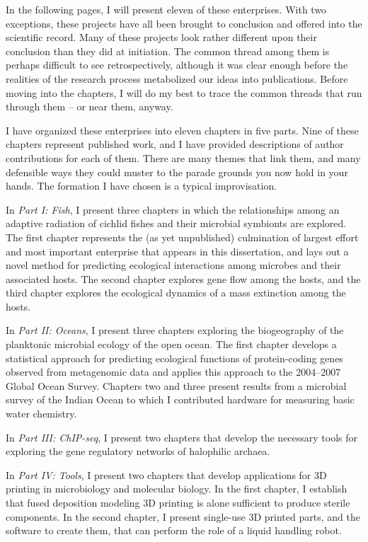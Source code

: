 In the following pages, I will present eleven of these enterprises. With two exceptions, these projects have all been brought to conclusion and offered into the scientific record. Many of these projects look rather different upon their conclusion than they did at initiation. The common thread among them is perhaps difficult to see retrospectively, although it was clear enough before the realities of the research process metabolized our ideas into publications. Before moving into the chapters, I will do my best to trace the common threads that run through them -- or near them, anyway.

I have organized these enterprises into eleven chapters in five parts. Nine of these chapters represent published work, and I have provided descriptions of author contributions for each of them. There are many themes that link them, and many defensible ways they could muster to the parade grounds you now hold in your hands. The formation I have chosen is a typical improvisation.

In {\em Part I: Fish}, I present three chapters in which the relationships among an adaptive radiation of cichlid fishes and their microbial symbionts are explored. The first chapter represents the (as yet unpublished) culmination of largest effort and most important enterprise that appears in this dissertation, and lays out a novel method for predicting ecological interactions among microbes and their associated hosts. The second chapter explores gene flow among the hosts, and the third chapter explores the ecological dynamics of a mass extinction among the hosts.

In {\em Part II: Oceans}, I present three chapters exploring the biogeography of the planktonic microbial ecology of the open ocean. The first chapter develops a statistical approach for predicting ecological functions of protein-coding genes observed from metagenomic data and applies this approach to the 2004--2007 Global Ocean Survey. Chapters two and three present results from a microbial survey of the Indian Ocean to which I contributed hardware for measuring basic water chemistry.

In {\em Part III: ChIP-seq}, I present two chapters that develop the necessary tools for exploring the gene regulatory networks of halophilic archaea.

In {\em Part IV: Tools}, I present two chapters that develop applications for 3D printing in microbiology and molecular biology. In the first chapter, I establish that fused deposition modeling 3D printing is alone sufficient to produce sterile components. In the second chapter, I present single-use 3D printed parts, and the software to create them, that can perform the role of a liquid handling robot. 

